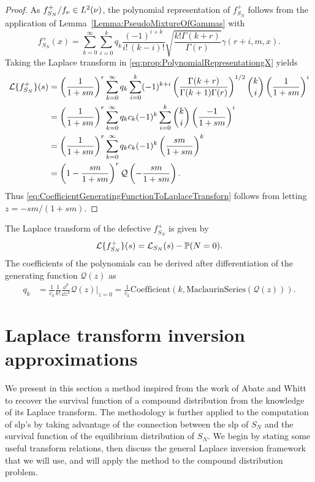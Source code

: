 \begin{proof}
As $f_{S_N}^+/f_{\nu}\in L^{2}(\nu)$, the polynomial representation of $f_{S_N}^+$ follows from the application of Lemma~\ref{Lemma:PseudoMixtureOfGammas} with
\begin{equation}\label{eq:prop:PolynomialRepresentationgX}
f_{S_N}^+(x)=\sum_{k=0}^{\infty}\sum_{i=0}^{k}q_k\frac{(-1)^{i+k}}{i! \, (k-i)!} \sqrt{\frac{k! \Gamma(k+r)}{\Gamma(r)}}\gamma(r+i,m,x).
\end{equation}
Taking the Laplace transform in \eqref{eq:prop:PolynomialRepresentationgX} yields
\begin{align*} %
\LT{f_{S_N}^+}(s)
&= \left(\frac{1}{1+sm}\right)^{r}\sum_{k=0}^{\infty}q_k \sum_{i=0}^{k} (-1)^{k+i} \left(\frac{\Gamma(k+r)}{\Gamma(k+1)\Gamma(r)}\right)^{1/2} \binom{k}{i} \left(\frac{1}{1+sm}\right)^{i}\nonumber \\
&= \left(\frac{1}{1+sm}\right)^{r}\sum_{k=0}^{\infty}q_k c_k (-1)^{k} \sum_{i=0}^{k} \binom{k}{i} \left(\frac{-1}{1+sm}\right)^{i} \nonumber\\
&= \left(\frac{1}{1+sm}\right)^{r}\sum_{k=0}^{\infty}q_k c_k (-1)^{k} \left( \frac{sm}{1+sm}  \right)^{k}\nonumber \\
&= \left( 1 - \frac{sm}{1+sm}\right)^{r}\mathcal{Q}\left(-\frac{sm}{1+sm}\right).
\end{align*}
Thus \eqref{eq:CoefficientGeneratingFunctionToLaplaceTransforn} follows from letting $z= -sm / (1+sm)$.
\end{proof}
The Laplace transform of the defective \pdf $f_{S_N}^{+}$ is given by 
$$
\mathcal{L}\{f_{S_N}^{+}\}(s)=\mathcal{L}_{S_N}(s)-\mathbb{P}(N=0).
$$
The coefficients of the polynomials can be derived after differentiation of the generating function $\mathcal{Q}(z)$ as
\begin{align*}\label{eq:PolynomialExpansionCoefficientDerivativeGeneratingFunction}
q_k&=\frac{1}{c_k}\frac{1}{k!}\frac{\dd^{k}}{\dd z^{k}}\mathcal{Q}(z)\Big\rvert_{z=0}  =\frac{1}{c_k} \text{Coefficient}(k, \text{MaclaurinSeries}(\mathcal{Q}(z))).
\end{align*}



\section{Laplace transform inversion approximations}\label{sec:NumericalInversionLaplaceTransform}
We present in this section a method inspired from the work of Abate and Whitt \cite{Abate1992} to recover the survival function of a compound distribution from the knowledge of its Laplace transform. The methodology is further applied to the computation of slp's by taking advantage of the connection between the slp of $S_N$ and the survival function of the equilibrium distribution of $S_N$. We begin by stating some useful transform relations, then discuss the general Laplace inversion framework that we will use, and will apply the method to the compound distribution problem.

